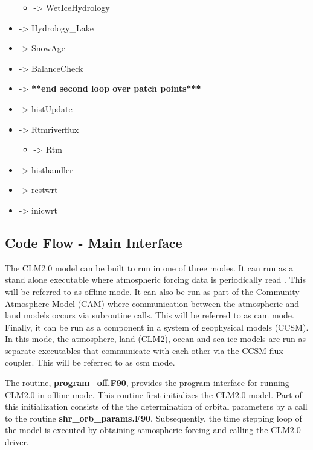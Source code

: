 \documentclass[]{article}
\begin{document}
\begin{itemize}
\begin{itemize}
\begin{itemize}
     \end{itemize}
   \item -> WetIceHydrology 
   \end{itemize}
\item ->  Hydrology\_Lake 
\item ->  SnowAge 
\item ->  BalanceCheck 
\item -> {\bf ***end second loop over patch points***} 
\item ->  histUpdate 
\item ->  Rtmriverflux 
   \begin{itemize}
   \item ->  Rtm 
   \end{itemize}
\item ->  histhandler 
\item ->  restwrt 
\item ->  inicwrt 

\end{itemize}

\subsection {Code Flow - Main Interface}

The CLM2.0 model can be built to run in one of three modes. It can run
as a stand alone executable where atmospheric forcing data is
periodically read . This will be referred to as offline mode. It can
also be run as part of the Community Atmosphere Model (CAM) where
communication between the atmospheric and land models occurs via
subroutine calls. This will be referred to as cam mode. Finally, it
can be run as a component in a system of geophysical models (CCSM).
In this mode, the atmosphere, land (CLM2), ocean and sea-ice models
are run as separate executables that communicate with each other via
the CCSM flux coupler. This will be referred to as csm mode. \newline

 The routine, {\bf program\_off.F90},
provides the program interface for running CLM2.0 in offline
mode. This routine first initializes the CLM2.0 model. Part of this
initialization consists of the the determination of orbital parameters
by a call to the routine {\bf shr\_orb\_params.F90}.  Subsequently,
the time stepping loop of the model is executed by obtaining
atmospheric forcing and calling the CLM2.0 driver. \newline
\end{document}
